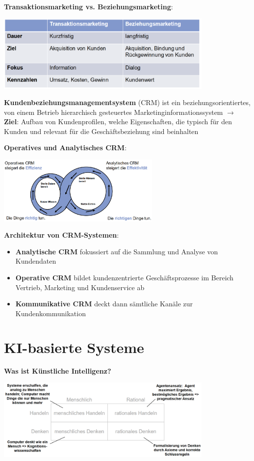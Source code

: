 \textbf{Transaktionsmarketing vs. Beziehungsmarketing}:
\begin{center}
	\includegraphics[width=0.8\textwidth]{images/tb.png}
\end{center}

\textbf{Kundenbeziehungsmanagementsystem} (CRM) ist ein beziehungsorientiertes, von einem Betrieb hierarchisch gesteuertes Marketinginformationssystem $\rightarrow$ \textbf{Ziel}: Aufbau von Kundenprofilen, welche Eigenschaften, die typisch für den Kunden und relevant für die Geschäftsbeziehung sind beinhalten

\pagebreak
\textbf{Operatives und Analytisches CRM}:
\begin{center}
	\includegraphics[width=0.6\textwidth]{images/crm.png}
\end{center}

\textbf{Architektur von CRM-Systemen}:
\begin{itemize}
	\item \textbf{Analytische CRM} fokussiert auf die Sammlung und Analyse von Kundendaten
	\item \textbf{Operative CRM} bildet kundenzentrierte Geschäftsprozesse im Bereich Vertrieb, Marketing und Kundenservice ab
	\item \textbf{Kommunikative CRM} deckt dann sämtliche Kanäle zur Kundenkommunikation
\end{itemize}

\section{KI-basierte Systeme}
\textbf{Was ist Künstliche Intelligenz?}
\begin{center}
	\includegraphics[width=0.8\textwidth]{images/ki.png}
\end{center}

